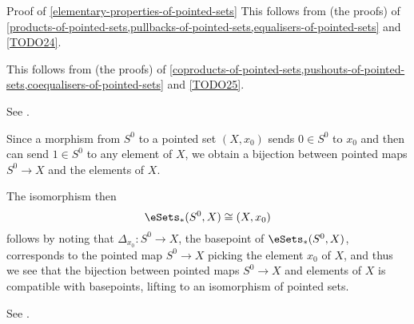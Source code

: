 \begin{Proof}{Proof of \cref{elementary-properties-of-pointed-sets}}%
    This follows from (the proofs) of \cref{products-of-pointed-sets,pullbacks-of-pointed-sets,equalisers-of-pointed-sets} and \cref{TODO24}.

    This follows from (the proofs) of \cref{coproducts-of-pointed-sets,pushouts-of-pointed-sets,coequalisers-of-pointed-sets} and \cref{TODO25}.

    See \cite{MSE2855868}.

    Since a morphism from $S^{0}$ to a pointed set $(X,x_{0})$ sends $0\in S^{0}$ to $x_{0}$ and then can send $1\in S^{0}$ to any element of $X$, we obtain a bijection between pointed maps $S^{0}\to X$ and the elements of $X$.

    The isomorphism then
    \[
        \eSets_{*}(S^{0},X)
        \cong
        (X,x_{0})
    \]%
    follows by noting that $\Delta_{x_{0}}\colon S^{0}\to X$, the basepoint of $\eSets_{*}(S^{0},X)$, corresponds to the pointed map $S^{0}\to X$ picking the element $x_{0}$ of $X$, and thus we see that the bijection between pointed maps $S^{0}\to X$ and elements of $X$ is compatible with basepoints, lifting to an isomorphism of pointed sets.

    See \cite{MSE884460}.
\end{Proof}
